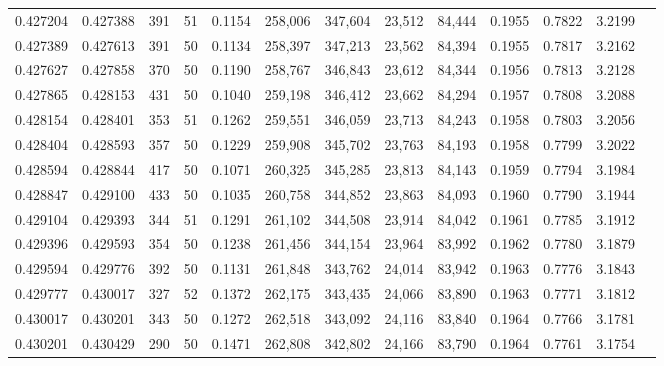 \begin{tabular}{rrrrrrrrrrrrr}
0.427204 & 0.427388 &   391 &  51 &                                     0.1154 & 258,006 & 347,604 &  23,512 &  84,444 & 0.1955 & 0.7822 & 3.2199 \\
0.427389 & 0.427613 &   391 &  50 &                                     0.1134 & 258,397 & 347,213 &  23,562 &  84,394 & 0.1955 & 0.7817 & 3.2162 \\
0.427627 & 0.427858 &   370 &  50 &                                     0.1190 & 258,767 & 346,843 &  23,612 &  84,344 & 0.1956 & 0.7813 & 3.2128 \\
0.427865 & 0.428153 &   431 &  50 &                                     0.1040 & 259,198 & 346,412 &  23,662 &  84,294 & 0.1957 & 0.7808 & 3.2088 \\
0.428154 & 0.428401 &   353 &  51 &                                     0.1262 & 259,551 & 346,059 &  23,713 &  84,243 & 0.1958 & 0.7803 & 3.2056 \\
0.428404 & 0.428593 &   357 &  50 &                                     0.1229 & 259,908 & 345,702 &  23,763 &  84,193 & 0.1958 & 0.7799 & 3.2022 \\
0.428594 & 0.428844 &   417 &  50 &                                     0.1071 & 260,325 & 345,285 &  23,813 &  84,143 & 0.1959 & 0.7794 & 3.1984 \\
0.428847 & 0.429100 &   433 &  50 &                                     0.1035 & 260,758 & 344,852 &  23,863 &  84,093 & 0.1960 & 0.7790 & 3.1944 \\
0.429104 & 0.429393 &   344 &  51 &                                     0.1291 & 261,102 & 344,508 &  23,914 &  84,042 & 0.1961 & 0.7785 & 3.1912 \\
0.429396 & 0.429593 &   354 &  50 &                                     0.1238 & 261,456 & 344,154 &  23,964 &  83,992 & 0.1962 & 0.7780 & 3.1879 \\
0.429594 & 0.429776 &   392 &  50 &                                     0.1131 & 261,848 & 343,762 &  24,014 &  83,942 & 0.1963 & 0.7776 & 3.1843 \\
0.429777 & 0.430017 &   327 &  52 &                                     0.1372 & 262,175 & 343,435 &  24,066 &  83,890 & 0.1963 & 0.7771 & 3.1812 \\
0.430017 & 0.430201 &   343 &  50 &                                     0.1272 & 262,518 & 343,092 &  24,116 &  83,840 & 0.1964 & 0.7766 & 3.1781 \\
0.430201 & 0.430429 &   290 &  50 &                                     0.1471 & 262,808 & 342,802 &  24,166 &  83,790 & 0.1964 & 0.7761 & 3.1754 \\

\end{tabular}
